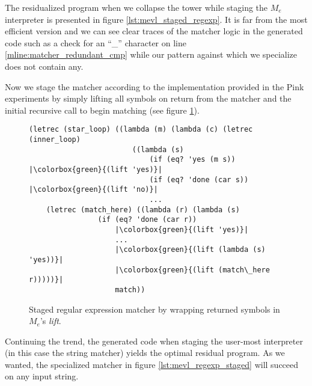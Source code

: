 \documentclass[a4paper,12pt,twoside,openright]{report}
\theoremstyle{definition}
\newcommand{\mevl}{$M_{e}$}
\begin{document}
The residualized program when we collapse the tower while staging the \mevl{} interpreter is presented in figure \ref{lst:mevl_staged_regexp}. It is far from the most efficient version and we can see clear traces of the matcher logic in the generated code such as a check for an ``\_'' character on line \ref{mline:matcher_redundant_cmp} while our pattern against which we specialize does not contain any.

Now we stage the matcher according to the implementation provided in the Pink experiments \cite{amin2017collapsing} by simply lifting all symbols on return from the matcher and the initial recursive call to begin matching (see figure \ref{lst:regexp_staged}).

\begin{figure}[htp!]
    \centering
    \begin{verbatim}
(letrec (star_loop) ((lambda (m) (lambda (c) (letrec (inner_loop)
                        ((lambda (s)
                            (if (eq? 'yes (m s)) |\colorbox{green}{(lift 'yes)}|
                            (if (eq? 'done (car s)) |\colorbox{green}{(lift 'no)}|
                            ...
    (letrec (match_here) ((lambda (r) (lambda (s)
                (if (eq? 'done (car r))
                    |\colorbox{green}{(lift 'yes)}|
                    ...
                    |\colorbox{green}{(lift (lambda (s) 'yes))}|
                    |\colorbox{green}{(lift (match\_here r)))))}|
                    match))
    \end{verbatim}
    \caption{Staged regular expression matcher by wrapping returned symbols in \mevl's \textit{lift}.}
    \label{lst:regexp_staged}
\end{figure}

Continuing the trend, the generated code when staging the user-most interpreter (in this case the string matcher) yields the optimal residual program. As we wanted, the specialized matcher in figure \ref{lst:mevl_regexp_staged} will succeed on any input string.
\end{document}

